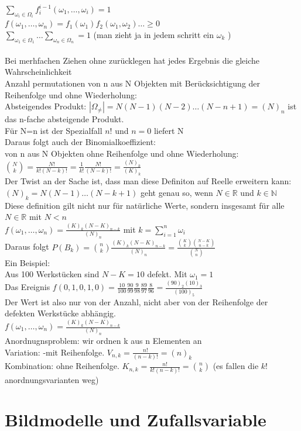 \documentclass{article}
\begin{document}
	$\sum_{\omega_i\in\Omega_i} f^{i-1}_i(\omega_1,\dots, \omega_i)=1$\\
	$f(\omega_1,\dots,\omega_n) = f_1(\omega_1)f_2(\omega_1,\omega_2)\dots\geq 0$\\
	$\sum_{\omega_1\in\Omega_1} \dots \sum_{\omega_n\in\Omega_n}  = 1$ (man zieht ja in jedem schritt ein $\omega_k$ )\\
	\\
	Bei merhfachen Ziehen ohne zurücklegen hat jedes Ergebnis die gleiche Wahrscheinlichkeit\\
	Anzahl permutationen von n aus N Objekten mit Berücksichtigung der Reihenfolge und ohne Wiederholung:\\
	Absteigendes Produkt: $|\Omega_\neq|=N(N-1)(N-2)\dots (N-n+1)= (N)_n$ ist das n-fache absteigende Produkt.\\
	Für N=n ist der Spezialfall $n!$ und $n=0$ liefert N\\
	Daraus folgt auch der Binomialkoeffizient:\\
	von n aus N Objekten ohne Reihenfolge und ohne Wiederholung:\\
	$\binom{N}{k} = \frac{N!}{k!(N-k)!} = \frac{1}{k!}\frac{N!}{(N-k)!} = \frac{(N)_k}{(K)_k}$\\
	Der Twist an der Sache ist, dass man diese Definiton auf Reelle erweitern kann:\\
	$(N)_k = N(N-1)\dots (N-k+1)$ geht genau so, wenn $N\in\mathbb{R}$ und $k\in\mathbb{N} $\\
	Diese definition gilt nicht nur für natürliche Werte, sondern insgesamt für alle $N\in\mathbb{R}$ mit $N<n$\\
	$f(\omega_1,\dots,\omega_n) = \frac{(K)_k (N-K)_{n-k}}{(N)_n}$ mit $k=\sum^n_{i=1} \omega_i$\\
	Daraus folgt $P(B_k) = \binom{n}{k} \frac{(K)_k (N-K)_{n-k}}{(N)_n} = \frac{\binom{K}{k}\binom{N-K}{n-k}}{\binom{N}{n}}$\\
	Ein Beispiel:\\
	Aus 100 Werkstücken sind $N-K=10$ defekt. Mit $\omega_1 = 1$\\
	Das Ereignis $f(0,1,0,1,0) = \frac{10}{100}\frac{90}{99}\frac{9}{98}\frac{89}{97}\frac{8}{96} = \frac{(90)_2 (10)_3}{(100)_5}$\\
	Der Wert ist also nur von der Anzahl, nicht aber von der Reihenfolge der defekten Werkstücke abhängig.\\
	$f(\omega_1,\dots,\omega_n) = \frac{(K)_k (N-K)_{n-k}}{(N)_n}$\\
	Anordnugnsproblem: wir ordnen k aus n Elementen an\\
	Variation: -mit Reihenfolge. $V_{n,k} = \frac{n!}{(n-k)!} = (n)_k$\\
	Kombination: ohne Reihenfolge. $K_{n,k} = \frac{n!}{k!(n-k)!} =\binom{n}{k}$ (es fallen die $k!$ anordnungsvarianten weg)
	\section{Bildmodelle und Zufallsvariable}
	
\end{document}
